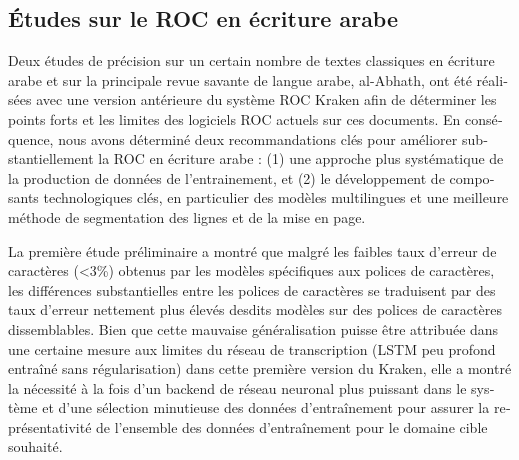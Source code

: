 \begin{french}
\section{Études sur le ROC en écriture arabe}

Deux études de précision sur un certain nombre de textes classiques en écriture
arabe et sur la principale revue savante de langue arabe, al-Abhath, ont été
réalisées avec une version antérieure du système ROC Kraken afin de déterminer
les points forts et les limites des logiciels ROC actuels sur ces documents. En
conséquence, nous avons déterminé deux recommandations clés pour améliorer
substantiellement la ROC en écriture arabe : (1) une approche plus systématique
de la production de données de l'entrainement, et (2) le développement de
composants technologiques clés, en particulier des modèles multilingues et une
meilleure méthode de segmentation des lignes et de la mise en page.

La première étude préliminaire a montré que malgré les faibles taux d'erreur de
caractères (<3\%) obtenus par les modèles spécifiques aux polices de
caractères, les différences substantielles entre les polices de caractères se
traduisent par des taux d'erreur nettement plus élevés desdits modèles sur des
polices de caractères dissemblables. Bien que cette mauvaise généralisation
puisse être attribuée dans une certaine mesure aux limites du réseau de
transcription (LSTM peu profond entraîné sans régularisation) dans cette
première version du Kraken, elle a montré la nécessité à la fois d'un backend
de réseau neuronal plus puissant dans le système et d'une sélection minutieuse
des données d'entraînement pour assurer la représentativité de l'ensemble des
données d'entraînement pour le domaine cible souhaité.


\end{french}
